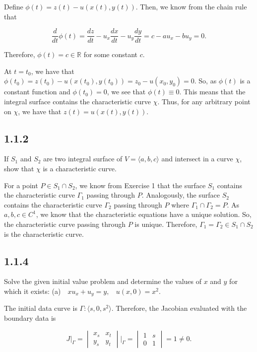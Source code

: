 \documentclass{article}
\begin{document}
\begin{flushleft}
  Define $\phi(t)=z(t)-u(x(t),y(t))$. Then, we know from the chain rule that
  
$$\frac{d}{dt}\phi(t)=\frac{dz}{dt}-u_x\frac{dx}{dt}-u_y\frac{dy}{dt}=c-au_x-bu_y=0.$$

Therefore, $\phi(t)=c\in\mathbb R$ for some constant $c$.  

At $t=t_0$, we have that $\phi(t_0)=z(t_0)-u(x(t_0),y(t_0))=z_0-u(x_0,y_0)=0$. So, as $\phi(t)$ is a constant function and $\phi(t_0)=0$, we see that $\phi(t)\equiv 0$. This means that the integral surface contains the characteristic curve $\chi$. Thus, for any arbitrary point on $\chi$, we have that $z(t)=u(x(t),y(t))$.

\subsection{\textbf{1.1.2}} If $S_1$ and $S_2$ are two integral surface of $V=\langle a,b,c \rangle$ and intersect in a curve $\chi$, show that $\chi$ is a characteristic curve.

For a point $P \in S_1 \cap S_2$, we know from Exercise 1 that the surface $S_1$ contains the characteristic curve $\Gamma_1$ passing through $P$. Analogously, the surface $S_2$ contains the characteristic curve $\Gamma_2$ passing through $P$ where $\Gamma_1 \cap \Gamma_2=P$. As $a,b,c \in C^1$, we know that the characteristic equations have a unique solution. So, the characteristic curve passing through $P$ is unique. Therefore, $\Gamma_1=\Gamma_2 \in S_1 \cap S_2$ is the characteristic curve.

\subsection{\textbf{1.1.4}} Solve the given initial value problem and determine the values of $x$ and $y$ for which it exists: \newline (a)~~$xu_x+u_y=y,~~~~ u(x,0)=x^2.$ 

The initial data curve is $\Gamma: \langle s,0,s^2 \rangle$. Therefore, the Jacobian evaluated with the boundary data is

$$J\Bigg|_\Gamma=\begin{vmatrix}
x_s & x_t \\
y_s & y_t
\end{vmatrix}\Bigg|_\Gamma=\begin{vmatrix}
1 & s \\
0 & 1
\end{vmatrix}=1 \neq 0.$$


\end{flushleft}
\end{document}

